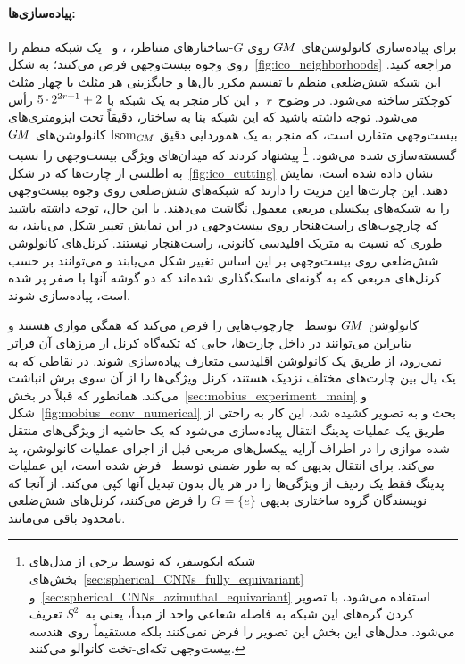 \paragraph{پیاده‌سازی‌ها:}
برای پیاده‌سازی کانولوشن‌های $G\mkern-1.4muM$ روی $G$-ساختارهای متناظر،
\citet{liu2018icoAltAz}، \citet{zhang2019orientation} و~\citet{gaugeIco2019}
یک شبکه منظم را روی وجوه بیست‌وجهی فرض می‌کنند؛ به شکل~\ref{fig:ico_neighborhoods} مراجعه کنید.
این شبکه شش‌ضلعی منظم با تقسیم مکرر یال‌ها و جایگزینی هر مثلث با چهار مثلث کوچکتر ساخته می‌شود.
در وضوح~$r$， این کار منجر به یک شبکه با ${5\mkern-1mu\cdot\mkern-1mu 2^{2r+1} + 2}$ رأس می‌شود.
توجه داشته باشید که این شبکه بنا به ساختار، دقیقاً تحت ایزومتری‌های بیست‌وجهی متقارن است، که منجر به یک هموردایی دقیق $\operatorname{Isom}_{G\mkern-1.4muM}$ کانولوشن‌های $G\mkern-1.4muM$ گسسته‌سازی شده می‌شود.%
\footnote{
    شبکه ایکوسفر، که توسط برخی از مدل‌های بخش‌های~\ref{sec:spherical_CNNs_fully_equivariant} و~\ref{sec:spherical_CNNs_azimuthal_equivariant} استفاده می‌شود، با تصویر کردن گره‌های این شبکه به فاصله شعاعی واحد از مبدأ، یعنی به~$S^2$ تعریف می‌شود.
    مدل‌های این بخش این تصویر را فرض نمی‌کنند بلکه مستقیماً روی هندسه بیست‌وجهی تکه‌ای-تخت کانوالو می‌کنند.
}
\citet{liu2018icoAltAz} پیشنهاد کردند که میدان‌های ویژگی بیست‌وجهی را نسبت به اطلسی از چارت‌ها که در شکل~\ref{fig:ico_cutting} نشان داده شده است، نمایش دهند.
این چارت‌ها این مزیت را دارند که شبکه‌های شش‌ضلعی روی وجوه بیست‌وجهی را به شبکه‌های پیکسلی مربعی معمول نگاشت می‌دهند.
با این حال، توجه داشته باشید که چارچوب‌های راست‌هنجار روی بیست‌وجهی در این نمایش تغییر شکل می‌یابند، به طوری که نسبت به متریک اقلیدسی کانونی، راست‌هنجار نیستند.
کرنل‌های کانولوشن شش‌ضلعی روی بیست‌وجهی بر این اساس تغییر شکل می‌یابند و می‌توانند بر حسب کرنل‌های مربعی که به گونه‌ای ماسک‌گذاری شده‌اند که دو گوشه آنها با صفر پر شده است، پیاده‌سازی شوند.


کانولوشن $G\mkern-1.4muM$ توسط~\citet{liu2018icoAltAz} چارچوب‌هایی را فرض می‌کند که همگی موازی هستند و بنابراین می‌توانند در داخل چارت‌ها، جایی که تکیه‌گاه کرنل از مرزهای آن فراتر نمی‌رود، از طریق یک کانولوشن اقلیدسی متعارف پیاده‌سازی شوند.
در نقاطی که به یک یال بین چارت‌های مختلف نزدیک هستند، کرنل ویژگی‌ها را از آن سوی برش انباشت می‌کند.
همانطور که قبلاً در بخش~\ref{sec:mobius_experiment_main} و شکل~\ref{fig:mobius_conv_numerical} بحث و به تصویر کشیده شد، این کار به راحتی از طریق یک عملیات پدینگ انتقال پیاده‌سازی می‌شود که یک حاشیه از ویژگی‌های منتقل شده موازی را در اطراف آرایه پیکسل‌های مربعی قبل از اجرای عملیات کانولوشن، پد می‌کند.
برای انتقال بدیهی که به طور ضمنی توسط~\citet{liu2018icoAltAz} فرض شده است، این عملیات پدینگ فقط یک ردیف از ویژگی‌ها را در هر یال بدون تبدیل آنها کپی می‌کند.
از آنجا که نویسندگان گروه ساختاری بدیهی $G=\{e\}$ را فرض می‌کنند، کرنل‌های شش‌ضلعی نامحدود باقی می‌مانند.



